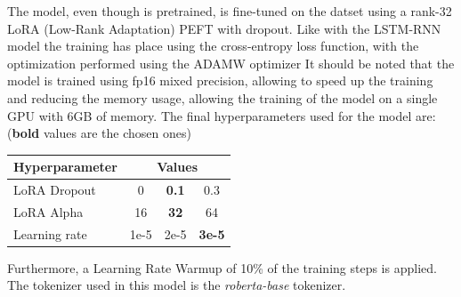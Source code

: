             The model, even though is pretrained, is fine-tuned on the datset using a rank-32 LoRA (Low-Rank Adaptation) PEFT
            with dropout. Like with the LSTM-RNN model the training has place using the cross-entropy loss function, 
            with the optimization performed using the ADAMW optimizer \citep{loshchilov2019decoupledweightdecayregularization}
            It should be noted that the model is trained using fp16 mixed precision, allowing
            to speed up the training and reducing the memory usage, allowing the
            training of the model on a single GPU with 6GB of memory.
            The final hyperparameters used for the model are: \\
            (\textbf{bold} values are the chosen ones)
            \begin{table}[H]
                \centering
                \begin{tabular}{l c c c}
                    \toprule
                    \multicolumn{1}{l}{\textbf{Hyperparameter}} & \multicolumn{3}{c}{\textbf{Values}} \\                  \midrule
                    LoRA Dropout & 0 & \textbf{0.1} & 0.3 \\
                    LoRA Alpha & 16 & \textbf{32} & 64 \\
                    Learning rate & 1e-5 & 2e-5 & \textbf{3e-5} \\
                    \bottomrule
                \end{tabular}
                \label{tab:roberta_hyperparams}
            \end{table}
            Furthermore, a Learning Rate Warmup \citep{kalra2024warmuplearningrateunderlying} of 10\% of the training steps
            is applied.
            The tokenizer used in this model is the \textit{roberta-base} tokenizer.